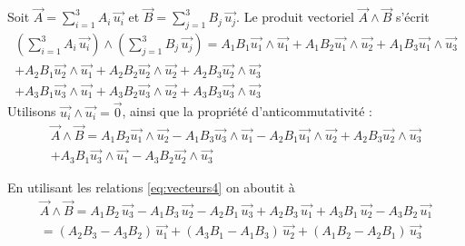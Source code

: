\begin{kaoexample}[frametitle=Démonstration]
Soit $\overrightarrow{A}=\sum_{i=1}^3 A_i\, \overrightarrow{u_i}$ et  $\overrightarrow{B}=\sum_{j=1}^3 B_j\, \overrightarrow{u_j}$. Le produit vectoriel $\overrightarrow{A}\wedge \overrightarrow{B}$ s'écrit
	\begin{multline*}		
		\left(\sum_{i=1}^3 A_i\, \overrightarrow{u_i}\right)\wedge 
		\left(\sum_{j=1}^3 B_j\, \overrightarrow{u_j}\right)=
		A_1B_1 \overrightarrow{u_1}\wedge \overrightarrow{u_1}+
		A_1B_2 \overrightarrow{u_1}\wedge \overrightarrow{u_2}+
		A_1B_3 \overrightarrow{u_1}\wedge \overrightarrow{u_3}\\
		+
		A_2B_1 \overrightarrow{u_2}\wedge \overrightarrow{u_1}+
		A_2B_2 \overrightarrow{u_2}\wedge \overrightarrow{u_2}+
		A_2B_3 \overrightarrow{u_2}\wedge \overrightarrow{u_3}\\
		+
		A_3B_1 \overrightarrow{u_3}\wedge \overrightarrow{u_1}+
		A_3B_2 \overrightarrow{u_3}\wedge \overrightarrow{u_2}+
		A_3B_3 \overrightarrow{u_3}\wedge \overrightarrow{u_3}
	\end{multline*}	
	Utilisons $\overrightarrow{u_i}\wedge \overrightarrow{u_i}=\overrightarrow{0}$, ainsi que la propriété d'anticommutativité :
	\begin{multline*}		
		\overrightarrow{A}\wedge \overrightarrow{B}=
		A_1B_2 \overrightarrow{u_1}\wedge \overrightarrow{u_2}-
		A_1B_3 \overrightarrow{u_3}\wedge \overrightarrow{u_1}-
		A_2B_1 \overrightarrow{u_1}\wedge \overrightarrow{u_2}+
		A_2B_3 \overrightarrow{u_2}\wedge \overrightarrow{u_3}\\
		+
		A_3B_1 \overrightarrow{u_3}\wedge \overrightarrow{u_1}
		-A_3B_2 \overrightarrow{u_2}\wedge \overrightarrow{u_3}
	\end{multline*} 
	
	En utilisant les relations \eqref{eq:vecteurs4} on aboutit à  
	\begin{multline*}		
		\overrightarrow{A}\wedge \overrightarrow{B}=
		A_1B_2 \,\overrightarrow{u_3}-A_1B_3 \,\overrightarrow{u_2}-A_2B_1 \,\overrightarrow{u_3}+
		A_2B_3 \,\overrightarrow{u_1}+A_3B_1 \,\overrightarrow{u_2}-A_3B_2 \,\overrightarrow{u_1}\\
		=(A_2B_3-A_3B_2)\,\overrightarrow{u_1}+(A_3B_1-A_1B_3)\,\overrightarrow{u_2}+
		(A_1B_2-A_2B_1)\,\overrightarrow{u_3}
	\end{multline*}
\end{kaoexample} 

	

